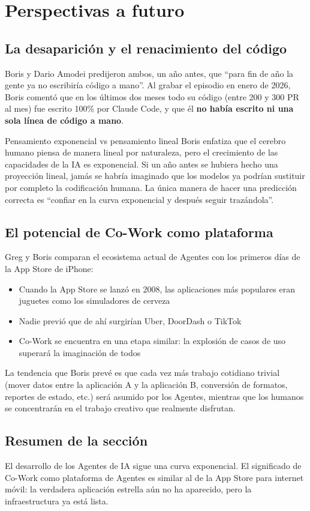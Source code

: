 \section{Perspectivas a futuro}

\subsection{La desaparición y el renacimiento del código}

Boris y Dario Amodei predijeron ambos, un año antes, que ``para fin de año la gente ya no escribiría código a mano''. Al grabar el episodio en enero de 2026, Boris comentó que en los últimos dos meses todo su código (entre 200 y 300 PR al mes) fue escrito 100\% por Claude Code, y que él \textbf{no había escrito ni una sola línea de código a mano}.

\begin{knowledgebox}{Pensamiento exponencial vs pensamiento lineal}
Boris enfatiza que el cerebro humano piensa de manera lineal por naturaleza, pero el crecimiento de las capacidades de la IA es exponencial. Si un año antes se hubiera hecho una proyección lineal, jamás se habría imaginado que los modelos ya podrían sustituir por completo la codificación humana. La única manera de hacer una predicción correcta es ``confiar en la curva exponencial y después seguir trazándola''.
\end{knowledgebox}

\subsection{El potencial de Co-Work como plataforma}

Greg y Boris comparan el ecosistema actual de Agentes con los primeros días de la App Store de iPhone:

\begin{itemize}
    \item Cuando la App Store se lanzó en 2008, las aplicaciones más populares eran juguetes como los simuladores de cerveza
    \item Nadie previó que de ahí surgirían Uber, DoorDash o TikTok
    \item Co-Work se encuentra en una etapa similar: la explosión de casos de uso superará la imaginación de todos
\end{itemize}

La tendencia que Boris prevé es que cada vez más trabajo cotidiano trivial (mover datos entre la aplicación A y la aplicación B, conversión de formatos, reportes de estado, etc.) será asumido por los Agentes, mientras que los humanos se concentrarán en el trabajo creativo que realmente disfrutan.

\subsection{Resumen de la sección}

El desarrollo de los Agentes de IA sigue una curva exponencial. El significado de Co-Work como plataforma de Agentes es similar al de la App Store para internet móvil: la verdadera aplicación estrella aún no ha aparecido, pero la infraestructura ya está lista.
